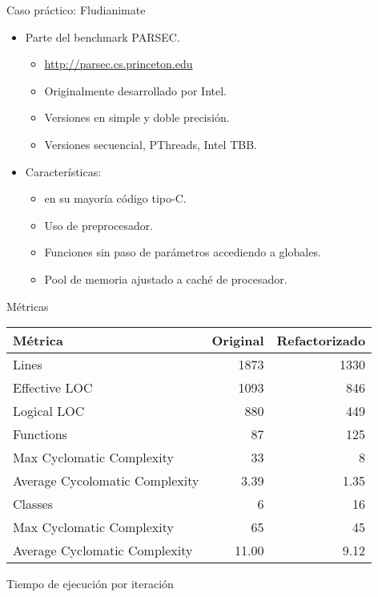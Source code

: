 \begin{frame}[t]{Caso práctico: Fludianimate}
\begin{itemize}
  \item Parte del benchmark PARSEC.
    \begin{itemize}
      \item \url{http://parsec.cs.princeton.edu}
      \item Originalmente desarrollado por Intel.
      \item Versiones en simple y doble precisión.
      \item Versiones secuencial, PThreads, Intel TBB.
    \end{itemize}

  \vfill\pause
  \item Características:
    \begin{itemize}
      \item en su mayoría código tipo-C.
      \item Uso de preprocesador.
      \item Funciones sin paso de parámetros accediendo a globales.
      \item Pool de memoria ajustado a caché de procesador.
    \end{itemize}
  
\end{itemize}
\end{frame}

\begin{frame}{Métricas}
\begin{tabular}{|l|r|r|}
\hline
Métrica & Original & Refactorizado\\
\hline
\hline
Lines		& 1873	& 1330\\
Effective LOC 	& 1093	& 846\\
Logical LOC 	& 880	& 449 \\
\hline
Functions	& 87	& 125\\
Max Cyclomatic Complexity	& 33	& 8\\
Average Cycolomatic Complexity	& 3.39	& 1.35\\
\hline
Classes		& 6	& 16 \\
Max Cyclomatic Complexity	& 65 & 45\\
Average Cyclomatic Complexity	& 11.00 & 9.12\\
\hline
\end{tabular}
\end{frame}

\begin{frame}{Tiempo de ejecución por iteración}
\end{frame}

